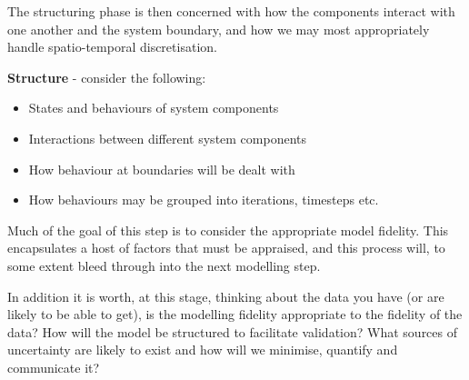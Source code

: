 The structuring phase is then concerned with how the components interact with 
one another and the system boundary, and how we may most appropriately handle
spatio-temporal discretisation.

\textbf{Structure} - consider the following:
\begin{itemize}
\item States and behaviours of system components
\item Interactions between different system components
\item How behaviour at boundaries will be dealt with
\item How behaviours may be grouped into iterations, timesteps etc.
\end{itemize}

Much of the goal of this step is to consider the appropriate model fidelity.
This encapsulates a host of factors that must be appraised, and this process
will, to some extent bleed through into the next modelling step.

In addition it is worth, at this stage, thinking about the data you have (or
are likely to be able to get), is the modelling fidelity appropriate to the
fidelity of the data? How will the model be structured to facilitate validation?
What sources of uncertainty are likely to exist and how will we minimise, quantify
and communicate it?
